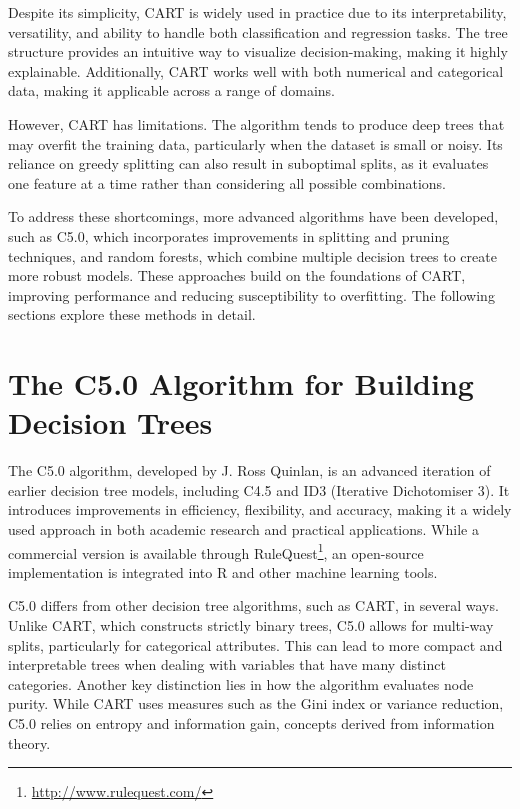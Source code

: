 \documentclass[
  11pt,
]{book}
\renewcommand{\href}[2]{#2\footnote{\url{#1}}}
\theoremstyle{definition}
\theoremstyle{definition}
\theoremstyle{definition}
\theoremstyle{definition}
\theoremstyle{remark}
\begin{document}
Despite its simplicity, CART is widely used in practice due to its interpretability, versatility, and ability to handle both classification and regression tasks. The tree structure provides an intuitive way to visualize decision-making, making it highly explainable. Additionally, CART works well with both numerical and categorical data, making it applicable across a range of domains.

However, CART has limitations. The algorithm tends to produce deep trees that may overfit the training data, particularly when the dataset is small or noisy. Its reliance on greedy splitting can also result in suboptimal splits, as it evaluates one feature at a time rather than considering all possible combinations.

To address these shortcomings, more advanced algorithms have been developed, such as C5.0, which incorporates improvements in splitting and pruning techniques, and random forests, which combine multiple decision trees to create more robust models. These approaches build on the foundations of CART, improving performance and reducing susceptibility to overfitting. The following sections explore these methods in detail.

\section{The C5.0 Algorithm for Building Decision Trees}\label{the-c5.0-algorithm-for-building-decision-trees}

The C5.0 algorithm, developed by J. Ross Quinlan, is an advanced iteration of earlier decision tree models, including C4.5 and ID3 (Iterative Dichotomiser 3). It introduces improvements in efficiency, flexibility, and accuracy, making it a widely used approach in both academic research and practical applications. While a commercial version is available through \href{http://www.rulequest.com/}{RuleQuest}, an open-source implementation is integrated into R and other machine learning tools.

C5.0 differs from other decision tree algorithms, such as CART, in several ways. Unlike CART, which constructs strictly binary trees, C5.0 allows for multi-way splits, particularly for categorical attributes. This can lead to more compact and interpretable trees when dealing with variables that have many distinct categories. Another key distinction lies in how the algorithm evaluates node purity. While CART uses measures such as the Gini index or variance reduction, C5.0 relies on entropy and information gain, concepts derived from information theory.
\end{document}
